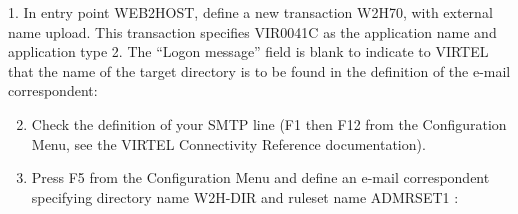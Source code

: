 \documentclass[letterpaper,10pt,english]{sphinxmanual}
\begin{document}
1. In entry point WEB2HOST, define a new transaction W2H\textendash{}70, with external name upload. This transaction specifies
VIR0041C as the application name and application type 2. The “Logon message” field is blank to indicate to VIRTEL
that the name of the target directory is to be found in the definition of the e-mail correspondent:


\begin{enumerate}
\setcounter{enumi}{1}
\item {} 
Check the definition of your SMTP line (F1 then F12 from the Configuration Menu, see the VIRTEL Connectivity Reference documentation).

\item {} 
Press F5 from the Configuration Menu and define an e-mail correspondent specifying directory name W2H-DIR and ruleset name ADMRSET1 :

\end{enumerate}
\end{document}
